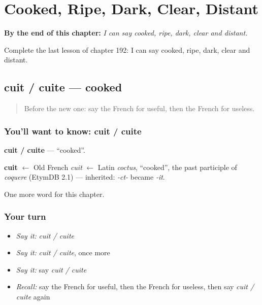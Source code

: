 
\chapter{Cooked, Ripe, Dark, Clear, Distant}
\label{ch:fr-cooked-ripe-dark-clear-distant}

\begin{chapteropening}
\textbf{By the end of this chapter:} \emph{I can say cooked, ripe, dark, clear and distant.}

Complete the last lesson of chapter 192: I can say cooked, ripe, dark, clear and distant.
\end{chapteropening}

\section[cuit / cuite]{cuit / cuite — cooked}

\label{lesson:FR-C192-cuit-cuite}



\begin{quote}
Before the new one: say the French for useful, then the French for useless.
\end{quote}

\subsection*{You'll want to know: cuit / cuite}
\textbf{cuit / cuite} — \textquotedblleft{}cooked\textquotedblright{}.

\begin{cousinweb}
\textbf{cuit} $\leftarrow$ Old French \emph{cuit} $\leftarrow$ Latin \emph{coctus}, \textquotedblleft{}cooked\textquotedblright{}, the past participle of \emph{coquere} (EtymDB 2.1) — inherited: \emph{-ct-} became \emph{-it}.
\end{cousinweb}

\begin{grammarlens}[title={What you've built}]
One more word for this chapter.
\end{grammarlens}

\subsection*{Your turn}
\begin{itemize}
\raggedright
  \item \emph{Say it:} \emph{cuit / cuite}
  \item \emph{Say it:} \emph{cuit / cuite}, once more
  \item \emph{Say it:} say \emph{cuit / cuite}
  \item \emph{Recall:} say the French for useful, then the French for useless, then say \emph{cuit / cuite} again
\end{itemize}

